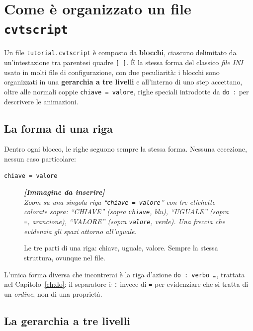 ﻿\documentclass[a4paper,12pt,oneside]{book}
\newcommand{\kw}[1]{\texttt{\color{keycolor}#1}}
\newcommand{\file}[1]{\texttt{#1}}
\newcommand{\imgph}[2]{%
  \begin{tcolorbox}[colback=cvtlightblue!30,colframe=cvtblue!40,%
    width=#1,halign=center,valign=center,height=5cm,boxrule=0.5pt,arc=3pt]%
    \textcolor{cvtgray}{\itshape\footnotesize\textbf{[Immagine da inserire]}\\[3pt]#2}%
  \end{tcolorbox}}
\begin{document}
\chapter{Come è organizzato un file \texttt{cvtscript}}
\label{ch:struttura}

Un file \file{tutorial.cvtscript} è composto da \textbf{blocchi}, ciascuno
delimitato da un'intestazione tra parentesi quadre \texttt{[~]}. È la stessa
forma del classico \emph{file INI} usato in molti file di configurazione, con
due peculiarità: i blocchi sono organizzati in una \textbf{gerarchia a tre
livelli} e all'interno di uno step accettano, oltre alle normali coppie
\texttt{chiave = valore}, righe speciali introdotte da \texttt{do :} per
descrivere le animazioni.

\section{La forma di una riga}

Dentro ogni blocco, le righe seguono sempre la stessa forma. Nessuna
eccezione, nessun caso particolare:

\begin{lstlisting}
chiave = valore
\end{lstlisting}

\begin{figure}[H]
  \centering
  \imgph{10cm}{Zoom su una singola riga ``\texttt{chiave = valore}'' con tre etichette colorate sopra: ``CHIAVE'' (sopra \texttt{chiave}, blu), ``UGUALE'' (sopra \texttt{=}, arancione), ``VALORE'' (sopra \texttt{valore}, verde). Una freccia che evidenzia gli spazi attorno all'uguale.}
  \caption{Le tre parti di una riga: chiave, uguale, valore. Sempre la stessa struttura, ovunque nel file.}
  \label{fig:anatomia-riga}
\end{figure}

L'unica forma diversa che incontrerai è la riga d'azione \kw{do : verbo \ldots},
trattata nel Capitolo~\ref{ch:do}: il separatore è \texttt{:} invece di
\texttt{=} per evidenziare che si tratta di un \emph{ordine}, non di una
proprietà.

\section{La gerarchia a tre livelli}
\end{document}
